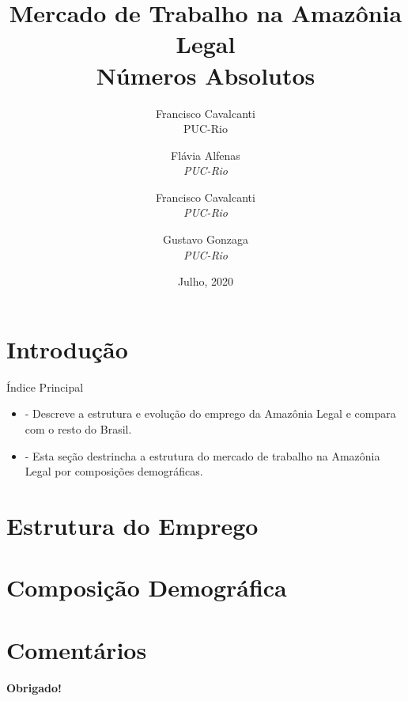 \documentclass[11pt]{beamer}
\author[Francisco Cavalcanti]{Francisco Cavalcanti\\\footnotesize{PUC-Rio}
}
\author{
Flávia  Alfenas\\
\textit{PUC-Rio}\\ \vspace{3mm}
\and  
Francisco Cavalcanti\\
\textit{PUC-Rio}\\ \vspace{3mm}
\and   
Gustavo Gonzaga \\
\textit{PUC-Rio} 
}
\date{Julho, 2020}
\title{Mercado de Trabalho na Amazônia Legal \\ Números Absolutos}
\begin{document}

\begin{frame}
\titlepage
\end{frame}


\section{Introdução}

\begin{frame}[label=indice_principal]{Índice Principal}

\begin{itemize}
\item{
	\hyperlink{_estrutura_emprego}{} - Descreve a estrutura e evolução do emprego da Amazônia Legal e compara com o resto do Brasil.
	}   
		  
	
\item{
	\hyperlink{_composicao_demografica}{} - Esta seção destrincha a estrutura do mercado de trabalho na Amazônia Legal por composições demográficas.
	}  

\end{itemize}

\end{frame}

\section{Estrutura do Emprego}




\section{Composição Demográfica}



\section{Comentários}


\frame
{
    \begin{center}
     \vfill
    \textbf{Obrigado!}
     \\

     \begin{small}
     \end{small}
     \vfill
\end{center}
}
\end{document}
